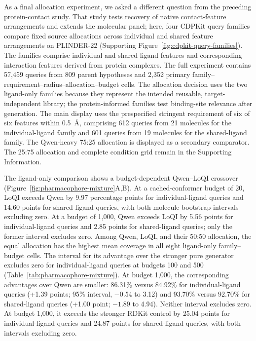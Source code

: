 As a final allocation experiment, we asked a different question from the preceding
protein-contact study. That study tests recovery of native contact-feature arrangements
and extends the molecular panel; here, four CDPKit query families compare fixed source
allocations across individual and shared feature arrangements on PLINDER-22
(Supporting Figure~\ref{fig:cdpkit-query-families}). The families comprise individual
and shared ligand features and corresponding interaction features derived from protein
complexes.
The full experiment contains 57,459 queries from 809 parent hypotheses and 2,352
primary family--requirement--radius--allocation--budget cells. The allocation decision
uses the two ligand-only families because they represent the intended reusable,
target-independent library; the protein-informed families test binding-site relevance
after generation. The main display uses the prespecified stringent requirement of
six of six features within 0.5~\AA{}, comprising 612 queries from 21 molecules for
the individual-ligand family and 601 queries from 19 molecules for the shared-ligand
family. The Qwen-heavy 75:25 allocation is displayed as a secondary comparator. The
25:75 allocation and complete condition grid remain in the Supporting Information.

The ligand-only comparison shows a budget-dependent Qwen--LoQI crossover
(Figure~\ref{fig:pharmacophore-mixture}A,B). At a cached-conformer budget of 20,
LoQI exceeds Qwen by 9.97 percentage points for individual-ligand queries and
14.60 points for
shared-ligand queries, with both molecule-bootstrap intervals excluding zero.
At a budget of 1,000, Qwen exceeds LoQI by 5.56 points for individual-ligand queries
and 2.85 points for shared-ligand queries; only the former interval excludes zero.
Among Qwen, LoQI, and their 50:50 allocation, the equal allocation has the highest
mean coverage in all eight ligand-only family--budget cells. The interval for its
advantage over the stronger pure generator excludes zero for individual-ligand
queries at budgets 100 and 500 (Table~\ref{tab:pharmacophore-mixture}).
At budget 1,000, the corresponding advantages over Qwen are smaller: 86.31\%
versus 84.92\% for individual-ligand queries (+1.39 points; 95\% interval,
$-0.54$ to 3.12) and 93.70\% versus 92.70\% for shared-ligand queries
(+1.00 point; $-1.89$ to 4.94). Neither interval excludes zero.
At budget 1,000, it exceeds the stronger RDKit control by 25.04 points for
individual-ligand queries and 24.87 points for shared-ligand queries, with both
intervals excluding zero.

